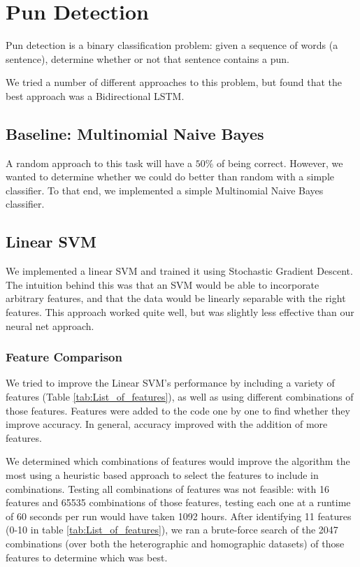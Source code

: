 \documentclass{article}
\begin{document}

\section{Pun Detection}\label{pun_detection}

Pun detection is a binary classification problem: given a sequence of words (a
sentence), determine whether or not that sentence contains a pun. 

We tried a number of different approaches to this problem, but found that the
best approach was a Bidirectional LSTM.

\subsection{Baseline: Multinomial Naive Bayes}

A random approach to this task will have a $50\%$ of being correct.
However, we wanted to determine whether we could do better than random with a
simple classifier. To that end, we implemented a simple Multinomial Naive Bayes
classifier. 

\subsection{Linear SVM}

We implemented a linear SVM and trained it using Stochastic Gradient Descent.
The intuition behind this was that an SVM would be able to incorporate arbitrary
features, and that the data would be linearly separable with the right features.
This approach worked quite well, but was slightly less effective than our neural
net approach.

\subsubsection{Feature Comparison}

We tried to improve the Linear SVM's performance by including a variety of
features (Table \ref{tab:List_of_features}), as well as using different
combinations of those features.  Features were added to the code one by one to
find whether they improve accuracy. In general, accuracy improved with the
addition of more features.

We determined which combinations of features would improve the algorithm the
most using a heuristic based approach to select the features to include in
combinations. Testing all combinations of features was not feasible: with 16
features and 65535 combinations of those features, testing each one at a runtime
of 60 seconds per run would have taken 1092 hours. After identifying 11
features (0-10 in table \ref{tab:List_of_features}), we ran a brute-force search
of the 2047 combinations (over both the heterographic and homographic datasets)
of those features to determine which was best.
\end{document}
